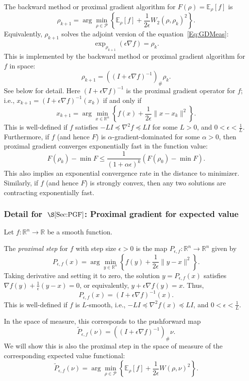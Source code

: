 \documentclass[final,12pt]{colt2018}
\newcommand{\R}{\mathbb{R}}
\newcommand{\E}{\mathbb{E}}
\renewcommand{\P}{\mathcal{P}}
\begin{document}
The backward method or proximal gradient algorithm for $F(\rho) = \E_\rho[f]$ is
$$\rho_{k+1} = \arg\min_{\rho \in \P} \left\{ \E_\rho[f] + \frac{1}{2\epsilon} W_2(\rho,\rho_k)^2 \right\}.$$
Equivalently, $\rho_{k+1}$ solves the adjoint version of the equation~\eqref{Eq:GDMeas}:
$$\exp_{\rho_{k+1}}(\epsilon \nabla f) = \rho_k.$$
This is implemented by the backward method or proximal gradient algorithm for $f$ in space:
$$\rho_{k+1} = \left((I+\epsilon \nabla f)^{-1}\right)_\# \rho_k.$$
See below for detail.
Here $(I+\epsilon \nabla f)^{-1}$ is the proximal gradient operator for $f$; i.e., $x_{k+1} = (I+\epsilon \nabla f)^{-1}(x_k)$ if and only if
$$x_{k+1} = \arg\min_{x \in \R^n} \left\{ f(x) + \frac{1}{2\epsilon} \|x-x_k\|^2 \right\}.$$
This is well-defined if $f$ satisfies $-LI \preceq \nabla^2 f \preceq LI$ for some $L > 0$, and $0 < \epsilon < \frac{1}{L}$.
Furthermore, if $f$ (and hence $F$) is $\alpha$-gradient-dominated for some $\alpha > 0$, then proximal gradient converges exponentially fast in the function value:
$$F(\rho_k) - \min F \le \frac{1}{(1+\alpha \epsilon)^k} (F(\rho_0)-\min F).$$
This also implies an exponential convergence rate in the distance to minimizer.
Similarly, if $f$ (and hence $F$) is strongly convex, then any two solutions are contracting exponentially fast.

\subsubsection{Detail for~$\S\ref{Sec:PGF}$: Proximal gradient for expected value}
\label{App:PGF}

Let $f \colon \R^n \to \R$ be a smooth function.

The {\em proximal step} for $f$ with step size $\epsilon > 0$ is the map $P_{\epsilon,f} \colon \R^n \to \R^n$ given by
$$P_{\epsilon,f}(x) = \arg\min_{y \in \R^n} \left\{ f(y) + \frac{1}{2\epsilon} \|y-x\|^2 \right\}.$$
Taking derivative and setting it to zero, the solution $y = P_{\epsilon,f}(x)$ satisfies
$\nabla f(y) + \frac{1}{\epsilon}(y-x) = 0$, or equivalently,
$y + \epsilon \nabla f(y) = x.$
Thus,
$$P_{\epsilon,f}(x) = (I + \epsilon \nabla f)^{-1}(x).$$
This is well-defined if $f$ is $L$-smooth, i.e., $-LI \preceq \nabla^2 f(x) \preceq LI$, and $0 < \epsilon < \frac{1}{L}$.

In the space of measure, this corresponds to the pushforward map
$$\widetilde P_{\epsilon,f}(\nu) = ((I+\epsilon \nabla f)^{-1})_\# \nu.$$
%
We will show this is also the proximal step in the space of measure of the corresponding expected value functional:
$$\widetilde P_{\epsilon,f}(\nu) = \arg\min_{\rho \in \P} \left\{ \E_\rho[f] + \frac{1}{2\epsilon} W(\rho,\nu)^2\right\}.$$
\end{document}
